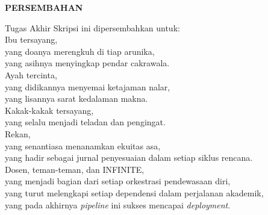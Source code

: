 
\clearpage
{}
{}
\begin{center}
    \textbf{\large PERSEMBAHAN}\\[3em]
\end{center}


\begin{center}
    Tugas Akhir Skripsi ini dipersembahkan untuk:\\[2em]

    Ibu tersayang,\\
    yang doanya merengkuh di tiap arunika,\\
    yang asihnya menyingkap pendar cakrawala.\\[2em]

    Ayah tercinta,\\
    yang didikannya menyemai ketajaman nalar,\\
    yang lisannya sarat kedalaman makna.\\[2em]

    Kakak-kakak tersayang,\\
    yang selalu menjadi teladan dan pengingat.\\[2em]

    Rekan,\\
    yang senantiasa menanamkan ekuitas asa,\\
    yang hadir sebagai jurnal penyesuaian dalam setiap siklus rencana.\\[2em]

    Dosen, teman-teman, dan INFINITE,\\
    yang menjadi bagian dari setiap orkestrasi pendewasaan diri,\\
    yang turut melengkapi setiap dependensi dalam perjalanan akademik,\\
    yang pada akhirnya \textit{pipeline} ini sukses mencapai \textit{deployment}.
\end{center}


